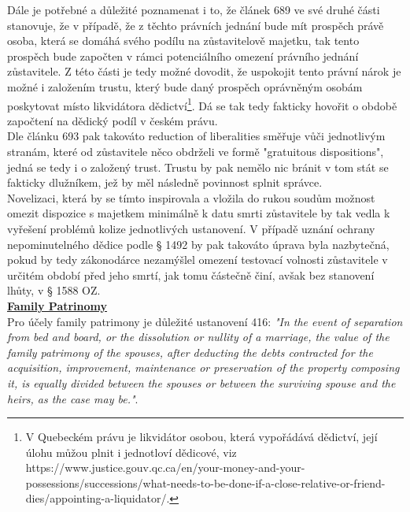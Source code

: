 \documentclass{article}
\begin{document}
Dále je potřebné a důležité poznamenat i to, že článek 689 ve své druhé části stanovuje, že v případě, že z těchto právních jednání bude mít prospěch právě osoba, která se domáhá svého podílu na zůstavitelově majetku, tak tento prospěch bude započten v rámci potenciálního omezení právního jednání zůstavitele. Z této části je tedy možné dovodit, že uspokojit tento právní nárok je možné i založením trustu, který bude daný prospěch oprávněným osobám poskytovat místo likvidátora dědictví\footnote{V Quebeckém právu je likvidátor osobou, která vypořádává dědictví, její úlohu můžou plnit i jednotloví dědicové, viz https://www.justice.gouv.qc.ca/en/your-money-and-your-possessions/successions/what-needs-to-be-done-if-a-close-relative-or-friend-dies/appointing-a-liquidator/.}. Dá se tak tedy fakticky hovořit o obdobě započtení na dědický podíl v českém právu.\\

Dle článku 693 pak takováto reduction of liberalities směřuje vůči jednotlivým stranám, které od zůstavitele něco obdrželi ve formě "gratuitous dispositions", jedná se tedy i o založený trust. Trustu by pak nemělo nic bránit v tom stát se fakticky dlužníkem, jež by měl následně povinnost splnit správce.\\

Novelizaci, která by se tímto inspirovala a vložila do rukou soudům možnost omezit dispozice s majetkem minimálně k datu smrti zůstavitele by tak vedla k vyřešení problémů kolize jednotlivých ustanovení. V případě uznání ochrany nepominutelného dědice podle § 1492 by pak takováto úprava byla nazbytečná, pokud by tedy zákonodárce nezamýšlel omezení testovací volnosti zůstavitele v určitém období před jeho smrtí, jak tomu částečně činí, avšak bez stanovení lhůty, v § 1588 OZ.\\

\underline{\textbf{Family Patrinomy}}\\

Pro účely family patrimony je důležité ustanovení 416: \textit{"In the event of separation from bed and board, or the dissolution or nullity of a marriage, the value of the family patrimony of the spouses, after deducting the debts contracted for the acquisition, improvement, maintenance or preservation of the property composing it, is equally divided between the spouses or between the surviving spouse and the heirs, as the case may be."}.\\
\end{document}
